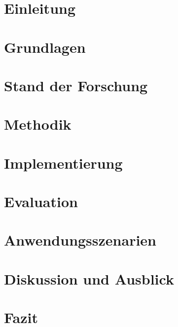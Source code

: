 \mainmatter

\chapter{Einleitung}\label{chap:introduction}
%
%

\chapter{Grundlagen}\label{chap:basics}
%

\chapter{Stand der Forschung}\label{chap:state_of_research}
%
%

\chapter{Methodik}\label{chap:methodology}
%
%

\chapter{Implementierung}\label{chap:implementation}

\chapter{Evaluation}\label{chap:evaluation}
%

\chapter{Anwendungsszenarien}\label{chap:application_scenarios}

\chapter{Diskussion und Ausblick}\label{chap:discussion}
%

\chapter{Fazit}\label{chap:conclusion}

%
